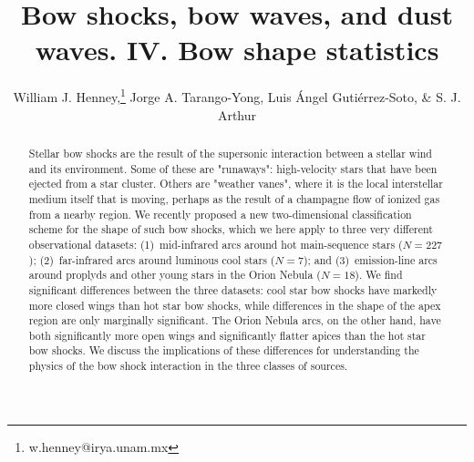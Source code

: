 \documentclass[useAMS, usenatbib, a4paper]{mnras}
\title[Bow shocks, bow waves, and dust waves. IV.]{Bow shocks, bow
  waves, and dust waves. IV. Bow shape statistics}
\author[Henney et al.]{
  William J. Henney,\thanks{w.henney@irya.unam.mx}
  Jorge A. Tarango-Yong,
  Luis \'Angel Guti\'errez-Soto,
  \& S. J. Arthur
  \\
  \AddressCRyA
}
\begin{document}
\maketitle
\begin{abstract}
  Stellar bow shocks are the result of the supersonic interaction
  between a stellar wind and its environment.  Some of these are
  "runaways": high-velocity stars that have been ejected from a star
  cluster.  Others are "weather vanes", where it is the local
  interstellar medium itself that is moving, perhaps as the result of
  a champagne flow of ionized gas from a nearby \hii{} region.
  We recently proposed a new two-dimensional classification scheme for
  the shape of such bow shocks, which we here apply to three very
  different observational datasets: (1)~mid-infrared arcs
  around hot main-sequence stars (\(N = 227\)); (2)~far-infrared arcs
  around luminous cool stars (\(N = 7\)); and (3)~emission-line arcs
  around proplyds and other young stars in the Orion Nebula
  (\(N = 18\)).  We find significant differences between the three
  datasets: cool star bow shocks have markedly more closed wings than
  hot star bow shocks, while differences in the shape of the apex
  region are only marginally significant.  The Orion Nebula arcs, on
  the other hand, have both significantly more open wings and
  significantly flatter apices than the hot star bow shocks.  We
  discuss the implications of these differences for understanding the
  physics of the bow shock interaction in the three classes of
  sources.
\end{abstract}


\clearpage



\clearpage


\appendix

\end{document}
